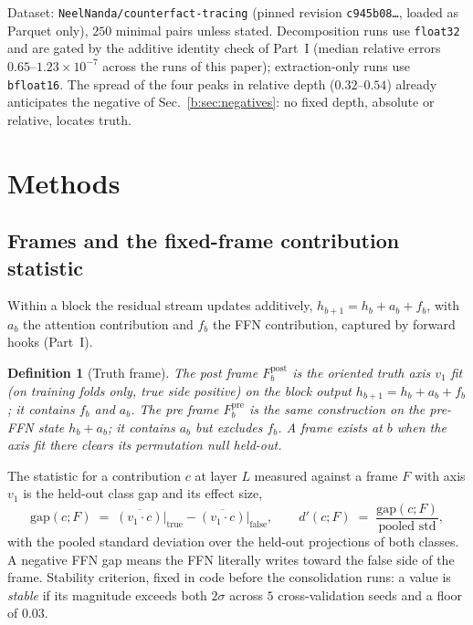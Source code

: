 \documentclass[11pt]{article}
\newtheorem{definition}{Definition}
\begin{document}
Dataset: \texttt{NeelNanda/counterfact-tracing} (pinned revision
\texttt{c945b08\ldots}, loaded as Parquet only), $250$ minimal pairs unless
stated. Decomposition runs use \texttt{float32} and are gated by the
additive identity check of Part~I (median relative errors
$0.65$--$1.23 \times 10^{-7}$ across the runs of this paper);
extraction-only runs use \texttt{bfloat16}. The spread of the four peaks in
relative depth ($0.32$--$0.54$) already anticipates the negative of
Sec.~\ref{b:sec:negatives}: no fixed depth, absolute or relative, locates
truth.

\section{Methods}
\label{b:sec:methods}

\subsection{Frames and the fixed-frame contribution statistic}
\label{b:sec:fixedaxis}

Within a block the residual stream updates additively,
$h_{b+1} = h_b + a_b + f_b$, with $a_b$ the attention contribution and $f_b$
the FFN contribution, captured by forward hooks (Part~I).

\begin{definition}[Truth frame]
The \emph{post frame} $F_b^{\mathrm{post}}$ is the oriented truth axis $v_1$
fit (on training folds only, true side positive) on the block output
$h_{b+1} = h_b + a_b + f_b$; it contains $f_b$ and $a_b$. The \emph{pre
frame} $F_b^{\mathrm{pre}}$ is the same construction on the pre-FFN state
$h_b + a_b$; it contains $a_b$ but excludes $f_b$. A frame \emph{exists} at
$b$ when the axis fit there clears its permutation null held-out.
\end{definition}

The statistic for a contribution $c$ at layer $L$ measured against a frame
$F$ with axis $v_1$ is the held-out class gap and its effect size,
\begin{equation}
\mathrm{gap}(c; F) \;=\; \overline{(v_1 \cdot c)}\big|_{\mathrm{true}}
- \overline{(v_1 \cdot c)}\big|_{\mathrm{false}},
\qquad
d'(c; F) \;=\; \frac{\mathrm{gap}(c; F)}{\text{pooled std}},
\end{equation}
with the pooled standard deviation over the held-out projections of both
classes. A negative FFN gap means the FFN literally writes toward the false
side of the frame. Stability criterion, fixed in code before the
consolidation runs: a value is \emph{stable} if its magnitude exceeds both
$2\sigma$ across $5$ cross-validation seeds and a floor of $0.03$.
\end{document}

